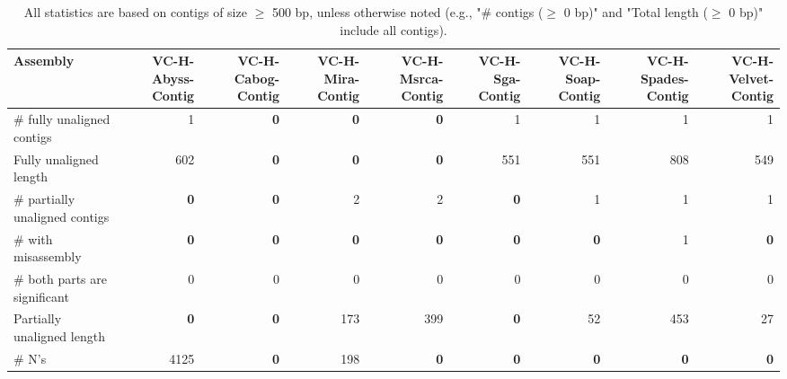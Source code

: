 \documentclass[12pt,a4paper]{article}
\begin{document}
\begin{table}[ht]
\begin{center}
\caption{All statistics are based on contigs of size $\geq$ 500 bp, unless otherwise noted (e.g., "\# contigs ($\geq$ 0 bp)" and "Total length ($\geq$ 0 bp)" include all contigs).}
\begin{tabular}{|l*{8}{|r}|}
\hline
Assembly & VC-H-Abyss-Contig & VC-H-Cabog-Contig & VC-H-Mira-Contig & VC-H-Msrca-Contig & VC-H-Sga-Contig & VC-H-Soap-Contig & VC-H-Spades-Contig & VC-H-Velvet-Contig \\ \hline
\# fully unaligned contigs & 1 & {\bf 0} & {\bf 0} & {\bf 0} & 1 & 1 & 1 & 1 \\ \hline
Fully unaligned length & 602 & {\bf 0} & {\bf 0} & {\bf 0} & 551 & 551 & 808 & 549 \\ \hline
\# partially unaligned contigs & {\bf 0} & {\bf 0} & 2 & 2 & {\bf 0} & 1 & 1 & 1 \\ \hline
\hspace{5mm}\# with misassembly & {\bf 0} & {\bf 0} & {\bf 0} & {\bf 0} & {\bf 0} & {\bf 0} & 1 & {\bf 0} \\ \hline
\hspace{5mm}\# both parts are significant & 0 & 0 & 0 & 0 & 0 & 0 & 0 & 0 \\ \hline
Partially unaligned length & {\bf 0} & {\bf 0} & 173 & 399 & {\bf 0} & 52 & 453 & 27 \\ \hline
\# N's & 4125 & {\bf 0} & 198 & {\bf 0} & {\bf 0} & {\bf 0} & {\bf 0} & {\bf 0} \\ \hline
\end{tabular}
\end{center}
\end{table}
\end{document}

